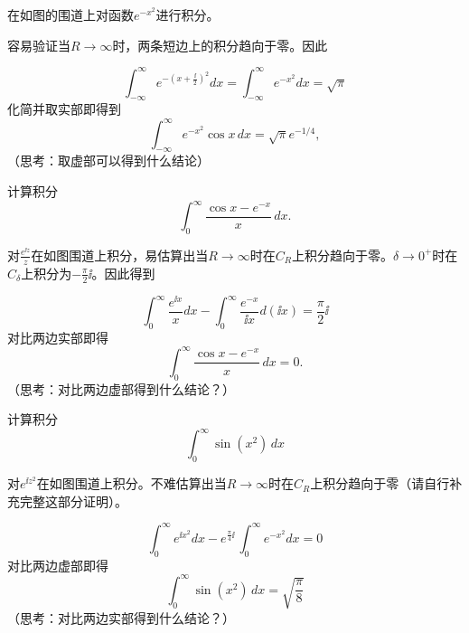 \documentclass[CJK]{beamer}
\begin{document}
\begin{frame}
  \bch


  在如图的围道上对函数$e^{-x^2}$进行积分。

  容易验证当$R\rightarrow \infty$时，两条短边上的积分趋向于零。因此

  $$\int_{-\infty}^{\infty} e^{-(x+\frac{\ii}{2})^2}dx = \int_{-\infty}^{\infty} e^{-x^2}dx  =\sqrt{\pi}$$
  化简并取实部即得到
  $$\int_{-\infty}^{\infty}  e^{-x^2}\cos x\,dx = \sqrt{\pi}e^{-1/4},$$
  {\scriptsize （思考：取虚部可以得到什么结论）}

  \ech
\end{frame}



\begin{frame}
  \bch
  计算积分$$ \int_0^{\infty} \frac{\cos{x} - e^{-x}}{x}\, dx.$$
  \ech
\end{frame}


\begin{frame}
  \bch
  \emini
  对$\frac{e^{\ii z}}{z}$在如图围道上积分，易估算出当$R\rightarrow \infty$时在$C_R$上积分趋向于零。$\delta\rightarrow 0^+$时在$C_\delta$上积分为$-\frac{\pi}{2}\ii$。因此得到
  \emini
  
  $$\int_0^\infty \frac{e^{\ii x}}{x} dx - \int_0^\infty \frac{e^{- x}}{\ii x} d(\ii x)  = \frac{\pi}{2}\ii$$
  对比两边实部即得
  $$ \int_0^{\infty} \frac{\cos{x} - e^{-x}}{x}\, dx = 0.$$
  {\scriptsize （思考：对比两边虚部得到什么结论？）}
  \ech
\end{frame}



\begin{frame}
  \bch
  
  计算积分 $$ \int_0^{\infty} \sin(x^2)\, dx $$
  \ech
\end{frame}




\begin{frame}
  \bch
  \emini
  对$e^{\ii z^2}$在如图围道上积分。不难估算出当$R\rightarrow \infty$时在$C_R$上积分趋向于零（请自行补充完整这部分证明）。
  \emini
  
  $$\int_0^\infty e^{\ii x^2} dx - e^{\frac{\pi}{4}\ii}\, \int_0^\infty e^{- x^2}dx  = 0 $$
  对比两边虚部即得
  $$ \int_0^{\infty} \sin(x^2)\,dx = \sqrt{\frac{\pi}{8}} $$ 
  {\scriptsize （思考：对比两边实部得到什么结论？）}
  \ech
\end{frame}
\end{document}
